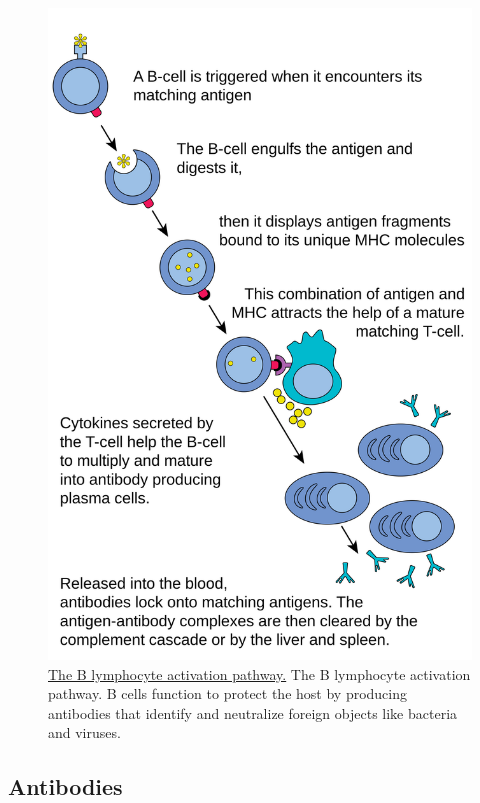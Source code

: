 \begin{figure}

{\centering \includegraphics[width=0.7\linewidth]{./figures/immune/B_cell_activation} 

}

\caption{\href{https://commons.wikimedia.org/wiki/File:B_cell_activation.svg}{The B lymphocyte activation pathway.} The B lymphocyte activation pathway. B cells function to protect the host by producing antibodies that identify and neutralize foreign objects like bacteria and viruses.}\label{fig:bcellactivation}
\end{figure}

\hypertarget{antibodies}{%
\subsection{Antibodies}\label{antibodies}}

